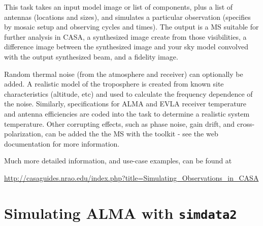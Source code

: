 This task takes an input model image or list of components, plus a
list of antennas (locations and sizes), and simulates a particular
observation (specifies by mosaic setup and observing cycles and
times).  The output is a MS suitable for further analysis in CASA, a
synthesized image create from those visibilities, a difference image
between the synthesized image and your sky model convolved with the
output synthesized beam, and a fidelity image.

Random thermal noise (from the atmosphere and receiver) can optionally
be added. A realistic model of the troposphere is created from known
site characteristics (altitude, etc) and used to calculate the
frequency dependence of the noise.  Similarly, specifications for ALMA
and EVLA receiver temperature and antenna efficiencies are coded into
the task to determine a realistic system temperature.  Other
corrupting effects, such as phase noise, gain drift, and
cross-polarization, can be added the the MS with the toolkit - see the
web documentation for more information.

Much more detailed information, and use-case examples, can be found at 

\url{http://casaguides.nrao.edu/index.php?title=Simulating_Observations_in_CASA}

\section{Simulating ALMA with {\tt simdata2}}
\label{section:sim.almasimmos}

